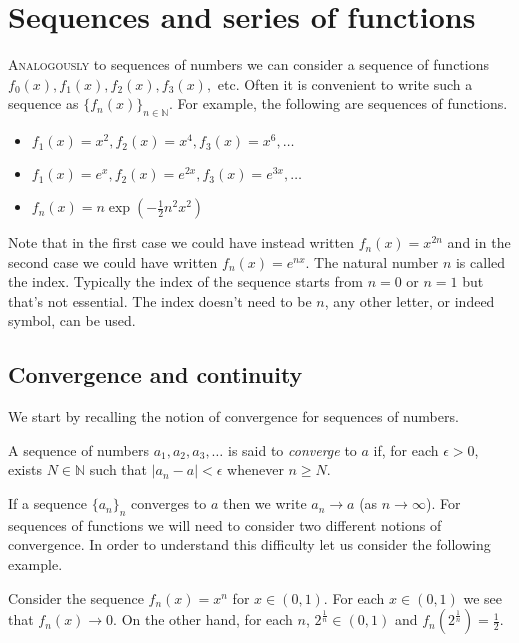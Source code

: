 \chapter{Sequences and series of functions}

\lettrine{A}{nalogously} to sequences of numbers we can consider a sequence of functions \(f_0(x),f_1(x), f_2(x), f_3(x),\) etc.
Often it is convenient to write such a sequence as \(\{ f_n(x)\}_{n\in \mathbb{N}}\).
For example, the following are sequences of functions.
\begin{itemize}
  \item \(f_1(x) = x^2, f_2(x)=x^4, f_3(x)=x^6,\ldots \)
  \item \(f_1(x) = e^x, f_2(x)=e^{2x}, f_3(x)=e^{3x},\ldots \)
  \item \(f_n(x) = n \exp \left( - \frac{1}{2}n^2 x^2 \right)\)
\end{itemize}

Note that in the first case we could have instead written \(f_n(x) = x^{2n}\) and in the second case we could have written  \(f_n(x) = e^{nx}\).
The natural number \(n\) is called the index.
Typically the index of the sequence starts from \(n=0\) or \(n=1\) but that's not essential.
The index doesn't need to be \(n\), any other letter, or indeed symbol, can be used.


\section{Convergence and continuity}

We start by recalling the notion of convergence for sequences of numbers.

\begin{definition}
  A sequence of numbers  \(a_1, a_2, a_3,\ldots \) is said to \emph{converge} to \(a\) if, for each \(\epsilon>0\), exists \(N\in \mathbb{N}\) such that \(|a_n - a| < \epsilon\) whenever \(n\geq N\).
\end{definition}
%
\noindent
If a sequence \({\{a_n\}}_{n}\) converges to \(a\) then we write \(a_n \to a\) (as \(n\to \infty\)).
For sequences of functions we will need to consider two different notions of convergence.
In order to understand this difficulty let us consider the following example.

\begin{example*}
  Consider the sequence \(f_n(x) = x^n\) for \(x\in (0,1)\).
  For each \(x\in (0,1)\) we see that \(f_n(x) \to 0\).
  On the other hand, for each \(n\), \(2^{\frac{1}{n}}\in (0,1)\) and \(f_n(2^{\frac{1}{n}}) = \frac{1}{2}\).
\end{example*}


